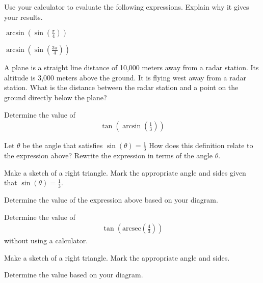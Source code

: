 \begin{problem}
\item Use your calculator to evaluate the following
  expressions. Explain why it gives your results.
  \begin{subproblem}
    \item $\arcsin\left(\sin\left(\frac{\pi}{4}\right)\right)$
      \vfill
    \item $\arcsin\left(\sin\left(\frac{3\pi}{4}\right)\right)$
      \vfill
  \end{subproblem}

  \clearpage

\item A plane is a straight line distance of 10,000 meters away from a
  radar station. Its altitude is 3,000 meters above the ground. It is
  flying west away from a radar station. What is the distance between
  the radar station and a point on the ground directly below the
  plane?
  \vfill

  \clearpage

\item Determine the value of
  \begin{eqnarray*}
    \tan\left(\arcsin\left(\frac{1}{3}\right)\right)
  \end{eqnarray*}

  \begin{subproblem}
  \item Let $\theta$ be the angle that satisfies ${\displaystyle \sin\left(\theta\right)=\frac{1}{3}}$
    How does this definition relate to the expression above? Rewrite the expression in terms of the angle $\theta$.
    \vspace{3em}
  \item Make a sketch of a right triangle. Mark the appropriate angle
    and sides given that ${\displaystyle \sin\left(\theta\right)=\frac{1}{3}}$.
    \vfill
  \item Determine the value of the expression above based on your diagram.
    \vfill
    \vfill
  \end{subproblem}

  \clearpage

\item Determine the value of
  \begin{eqnarray*}
    \tan\left(\mathrm{arcsec}\left(\frac{4}{3}\right)\right)
  \end{eqnarray*}
  without using a calculator.

  \begin{subproblem}
  \item Make a sketch of a right triangle. Mark the appropriate angle
    and sides.
    \vfill
  \item Determine the value based on your diagram.
    \vfill
    \vfill
  \end{subproblem}

\end{problem}

